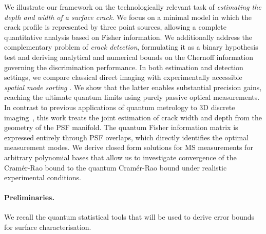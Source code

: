 \documentclass[reprint,amsmath,amssymb,aps,prl,floatfix,groupedaddress,superscriptaddress]{revtex4-2}
\begin{document}
We illustrate our framework on the technologically relevant task of {\em estimating the depth and width of a surface crack}. We focus on a minimal model in which the crack profile is represented by three point sources, allowing a complete quantitative analysis based on Fisher information. We additionally address the complementary problem of {\em crack detection}, formulating it as a binary hypothesis test \cite{GG} and deriving analytical and numerical bounds on the Chernoff information governing the discrimination performance. In both estimation and detection settings, we compare classical direct imaging with experimentally accessible {\em spatial mode sorting} \cite{modes,starlight,da2021super,MPLC,Paur:16,Yang:16,Tham:17,zhou2019quantum,Zanfo,Frank:23,bradypo}. We show that the latter enables substantial precision gains, reaching the ultimate quantum limits using purely passive optical measurements. {\color{red} In contrast to previous applications of quantum metrology to 3D discrete imaging~\cite{fiderer2021general,napoli2019towards}, this work treats the joint estimation of crack width and depth from the geometry of the PSF manifold. The quantum Fisher information matrix is expressed entirely through PSF overlaps, which directly identifies the optimal measurement modes. We derive closed form solutions for MS measurements for arbitrary polynomial bases that allow us to investigate convergence of the Cram\'er-Rao bound to the quantum Cram\'er-Rao bound under realistic experimental conditions.}


\paragraph{\bfseries Preliminaries.\label{sec:prelim}}
We recall the quantum statistical tools that will be used to derive error bounds for surface characterisation.
\end{document}
